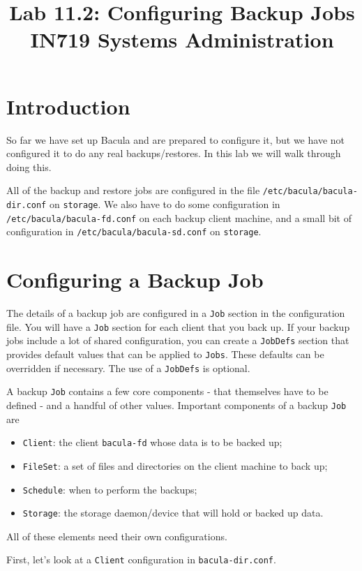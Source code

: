 \documentclass{article}   	%
\title{Lab 11.2:  Configuring Backup Jobs\\ IN719 Systems Administration}
\date{}							%
\begin{document}
\maketitle

\section*{Introduction}
So far we have set up Bacula and are prepared to configure it, but we have not configured it to do any real backups/restores. In this lab we will walk through doing this.

All of the backup and restore jobs are configured in the file \texttt{/etc/bacula/bacula-dir.conf} on \texttt{storage}. We also have to do some configuration in  \texttt{/etc/bacula/bacula-fd.conf} on each backup client machine, and a small bit of configuration in  \texttt{/etc/bacula/bacula-sd.conf} on \texttt{storage}.

\section{Configuring a Backup Job}
The details of a backup job are configured in a \texttt{Job} section in the configuration file.  You will have a \texttt{Job} section for each client that you back up.  If your backup jobs include a lot of shared configuration, you can create a \texttt{JobDefs} section that provides default values that can be applied to \texttt{Jobs}.  These defaults can be overridden if necessary.  The use of a \texttt{JobDefs} is optional.

A backup \texttt{Job} contains a few core components - that themselves have to be defined - and a handful of other values.  Important components of a backup \texttt{Job} are

\begin{itemize}
	\item \texttt{Client}: the client \texttt{bacula-fd} whose data is to be backed up;
	\item \texttt{FileSet}: a set of files and directories on the client machine to back up;
	\item \texttt{Schedule}: when to perform the backups;
	\item \texttt{Storage}: the storage daemon/device that will hold or backed up data.
\end{itemize}

All of these elements need their own configurations.

First, let's look at a \texttt{Client} configuration in \texttt{bacula-dir.conf}.
\end{document}
